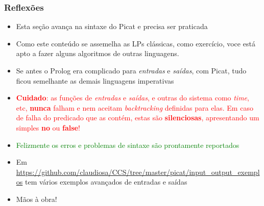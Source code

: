 
\begin{frame}[fragile]
\frametitle{Reflexões}

\begin{itemize}

  \item Esta seção avança na sintaxe do Picat e precisa 
  ser praticada
  
   \pause
  \item Como este conteúdo se assemelha as LPs clássicas, como exercício,
  voce está apto a fazer alguns algoritmos de outras linguagens.

  \pause 
  \item Se antes o Prolog era complicado para \textit{entradas} e \textit{saídas}, com Picat,
  tudo ficou semelhante as demais linguagens imperativas


  \pause
  \item \textcolor{red}{\textbf{Cuidado}: as funções de \textit{entradas} e \textit{saídas}, e outras do sistema como
  \textit{time}, etc,  \textbf{nunca} falham e nem aceitam \textit{backtracking} 
  definidas para elas. Em caso de falha do predicado que as contém, estas são \textbf{silenciosas},
  apresentando um simples \textbf{no} ou \textbf{false}!}
  
  \pause
  \item \textcolor{green}{Felizmente os erros e problemas de sintaxe  são prontamente reportados}
  
  \pause
  \item Em \url{https://github.com/claudiosa/CCS/tree/master/picat/input_output_exemplos}
  tem vários exemplos avançados de entradas e saídas 
  
  \pause
  \item Mãos à obra!
 
\end{itemize}

\end{frame}
